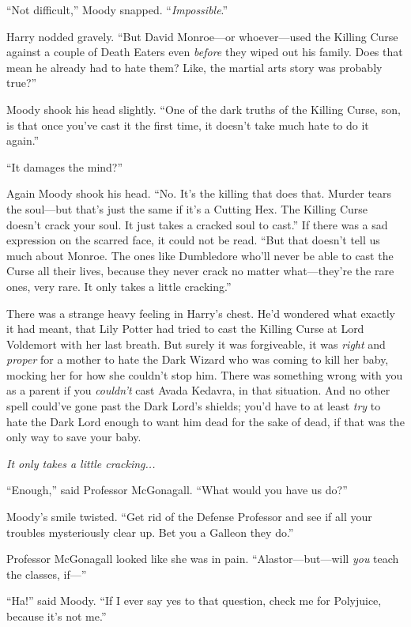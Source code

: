 “Not difficult,” Moody snapped. “\emph{Impossible}.”

Harry nodded gravely. “But David Monroe—or whoever—used the Killing Curse against a couple of Death Eaters even \emph{before} they wiped out his family. Does that mean he already had to hate them? Like, the martial arts story was probably true?”

Moody shook his head slightly. “One of the dark truths of the Killing Curse, son, is that once you’ve cast it the first time, it doesn’t take much hate to do it again.”

“It damages the mind?”

Again Moody shook his head. “No. It’s the killing that does that. Murder tears the soul—but that’s just the same if it’s a Cutting Hex. The Killing Curse doesn’t crack your soul. It just takes a cracked soul to cast.” If there was a sad expression on the scarred face, it could not be read. “But that doesn’t tell us much about Monroe. The ones like Dumbledore who’ll never be able to cast the Curse all their lives, because they never crack no matter what—they’re the rare ones, very rare. It only takes a little cracking.”

There was a strange heavy feeling in Harry’s chest. He’d wondered what exactly it had meant, that Lily Potter had tried to cast the Killing Curse at Lord Voldemort with her last breath. But surely it was forgiveable, it was \emph{right} and \emph{proper} for a mother to hate the Dark Wizard who was coming to kill her baby, mocking her for how she couldn’t stop him. There was something wrong with you as a parent if you \emph{couldn’t} cast Avada Kedavra, in that situation. And no other spell could’ve gone past the Dark Lord’s shields; you’d have to at least \emph{try} to hate the Dark Lord enough to want him dead for the sake of dead, if that was the only way to save your baby.

\emph{It only takes a little cracking...}

“Enough,” said Professor McGonagall. “What would you have us do?”

Moody’s smile twisted. “Get rid of the Defense Professor and see if all your troubles mysteriously clear up. Bet you a Galleon they do.”

Professor McGonagall looked like she was in pain. “Alastor—but—will \emph{you} teach the classes, if—”

“Ha!” said Moody. “If I ever say yes to that question, check me for Polyjuice, because it’s not me.”

